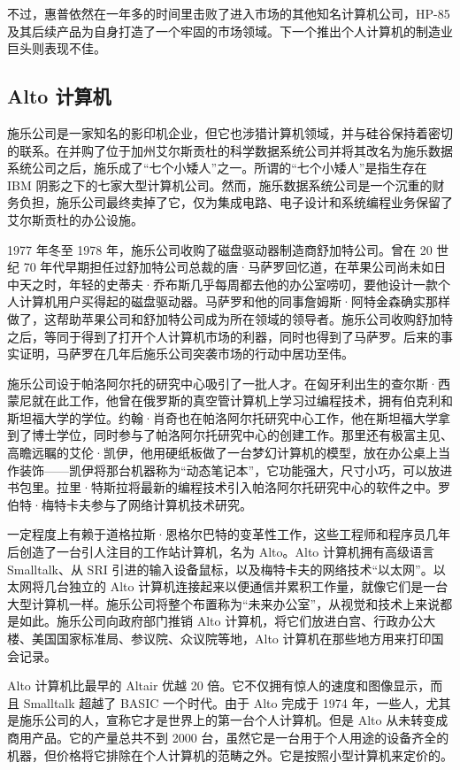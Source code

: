 \documentclass[12pt,UTF8]{ctexbook}
\begin{document}
不过，惠普依然在一年多的时间里击败了进入市场的其他知名计算机公司，HP-85 及其后续产品为自身打造了一个牢固的市场领域。下一个推出个人计算机的制造业巨头则表现不佳。





\subsection{Alto 计算机}


施乐公司是一家知名的影印机企业，但它也涉猎计算机领域，并与硅谷保持着密切的联系。在并购了位于加州艾尔斯贡杜的科学数据系统公司并将其改名为施乐数据系统公司之后，施乐成了“七个小矮人”之一。所谓的“七个小矮人”是指生存在 IBM 阴影之下的七家大型计算机公司。然而，施乐数据系统公司是一个沉重的财务负担，施乐公司最终卖掉了它，仅为集成电路、电子设计和系统编程业务保留了艾尔斯贡杜的办公设施。

1977 年冬至 1978 年，施乐公司收购了磁盘驱动器制造商舒加特公司。曾在 20 世纪 70 年代早期担任过舒加特公司总裁的唐·马萨罗回忆道，在苹果公司尚未如日中天之时，年轻的史蒂夫·乔布斯几乎每周都去他的办公室唠叨，要他设计一款个人计算机用户买得起的磁盘驱动器。马萨罗和他的同事詹姆斯·阿特金森确实那样做了，这帮助苹果公司和舒加特公司成为所在领域的领导者。施乐公司收购舒加特之后，等同于得到了打开个人计算机市场的利器，同时也得到了马萨罗。后来的事实证明，马萨罗在几年后施乐公司突袭市场的行动中居功至伟。

施乐公司设于帕洛阿尔托的研究中心吸引了一批人才。在匈牙利出生的查尔斯·西蒙尼就在此工作，他曾在俄罗斯的真空管计算机上学习过编程技术，拥有伯克利和斯坦福大学的学位。约翰·肖奇也在帕洛阿尔托研究中心工作，他在斯坦福大学拿到了博士学位，同时参与了帕洛阿尔托研究中心的创建工作。那里还有极富主见、高瞻远瞩的艾伦·凯伊，他用硬纸板做了一台梦幻计算机的模型，放在办公桌上当作装饰——凯伊将那台机器称为“动态笔记本”，它功能强大，尺寸小巧，可以放进书包里。拉里·特斯拉将最新的编程技术引入帕洛阿尔托研究中心的软件之中。罗伯特·梅特卡夫参与了网络计算机技术研究。

一定程度上有赖于道格拉斯·恩格尔巴特的变革性工作，这些工程师和程序员几年后创造了一台引人注目的工作站计算机，名为 Alto。Alto 计算机拥有高级语言 Smalltalk、从 SRI 引进的输入设备鼠标，以及梅特卡夫的网络技术“以太网”。以太网将几台独立的 Alto 计算机连接起来以便通信并累积工作量，就像它们是一台大型计算机一样。施乐公司将整个布置称为“未来办公室”，从视觉和技术上来说都是如此。施乐公司向政府部门推销 Alto 计算机，将它们放进白宫、行政办公大楼、美国国家标准局、参议院、众议院等地，Alto 计算机在那些地方用来打印国会记录。

Alto 计算机比最早的 Altair 优越 20 倍。它不仅拥有惊人的速度和图像显示，而且 Smalltalk 超越了 BASIC 一个时代。由于 Alto 完成于 1974 年，一些人，尤其是施乐公司的人，宣称它才是世界上的第一台个人计算机。但是 Alto 从未转变成商用产品。它的产量总共不到 2000 台，虽然它是一台用于个人用途的设备齐全的机器，但价格将它排除在个人计算机的范畴之外。它是按照小型计算机来定价的。
\end{document}
